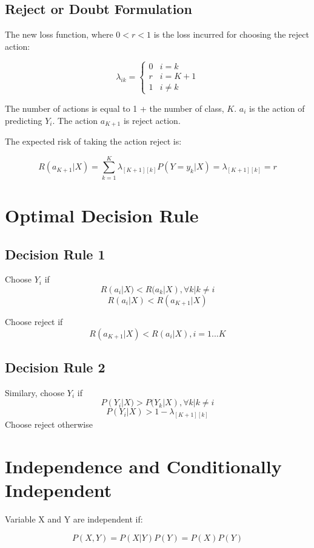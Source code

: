 \begin{multicols}{2}
\subsection{Reject or Doubt Formulation}
\noindent The new loss function, where $0 < r < 1$ is the loss incurred for choosing the reject action:

$$
\lambda_{ik} = 
\begin{cases}
0 & i=k\\
r & i = K + 1 \\
1 & i \ne k
\end{cases}
$$

\noindent The number of actions is equal to 1 + the number of class, $K$. $a_{i}$ is the action of predicting $Y_{i}$. The action $a_{K+1}$ is reject action. 

\noindent The expected risk of taking the action reject is:

$$R(a_{K+1}|X) = \sum_{k=1}^K \lambda_{[K+1][k]} P(Y=y_k|X) = \lambda_{[K+1][k]} = r$$

\section{Optimal Decision Rule}

\subsection{Decision Rule 1}

\noindent Choose $Y_{i}$ if 
$$R(a_{i}|X) < R(a_{k}|X), \forall k|k \ne i$$
$$R(a_{i}|X) < R(a_{K+1}|X)$$

\noindent Choose reject if
$$R(a_{K+1}|X) < R(a_{i}|X), i=1...K$$

\subsection{Decision Rule 2}

\noindent Similary, choose $Y_{i}$ if 
$$P(Y_{i}|X) > P(Y_{k}|X), \forall k|k \ne i$$
$$P(Y_{i}|X) > 1 - \lambda_{[K+1][k]}$$
\noindent Choose reject otherwise

\section{Independence and Conditionally Independent}

\noindent Variable X and Y are independent if:

$$P(X,Y)=P(X|Y) P(Y) = P(X) P(Y)$$


\end{multicols}
